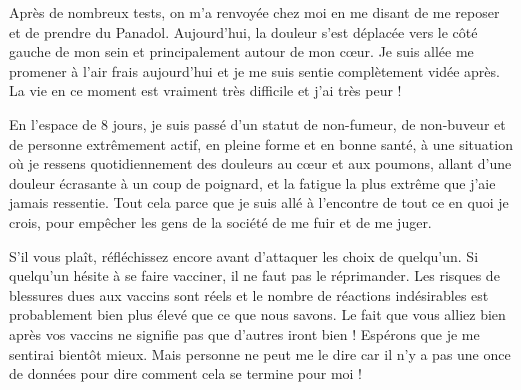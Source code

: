 Après de nombreux tests, on m'a renvoyée chez moi en me disant de me reposer et
de prendre du Panadol. Aujourd'hui, la douleur s'est déplacée vers le côté
gauche de mon sein et principalement autour de mon cœur. Je suis allée me
promener à l'air frais aujourd'hui et je me suis sentie complètement vidée
après. La vie en ce moment est vraiment très difficile et j'ai très peur !

En l'espace de 8 jours, je suis passé d'un statut de non-fumeur, de non-buveur
et de personne extrêmement actif, en pleine forme et en bonne santé, à une
situation où je ressens quotidiennement des douleurs au cœur et aux poumons,
allant d'une douleur écrasante à un coup de poignard, et la fatigue la plus
extrême que j'aie jamais ressentie. Tout cela parce que je suis allé à
l'encontre de tout ce en quoi je crois, pour empêcher les gens de la société de
me fuir et de me juger.

S'il vous plaît, réfléchissez encore avant d'attaquer les choix de quelqu'un. Si
quelqu'un hésite à se faire vacciner, il ne faut pas le réprimander. Les risques
de blessures dues aux vaccins sont réels et le nombre de réactions indésirables
est probablement bien plus élevé que ce que nous savons. Le fait que vous alliez
bien après vos vaccins ne signifie pas que d'autres iront bien ! Espérons que je
me sentirai bientôt mieux. Mais personne ne peut me le dire car il n'y a pas une
once de données pour dire comment cela se termine pour moi !
